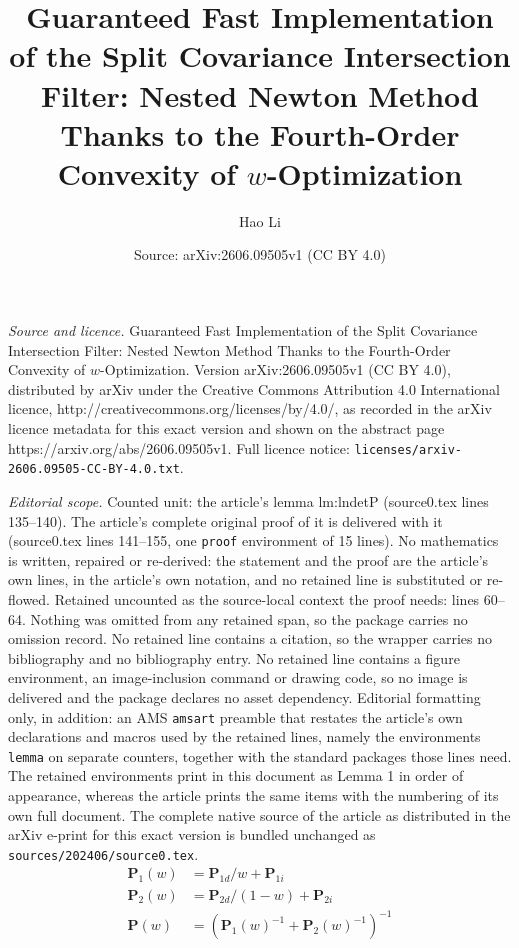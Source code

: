 \documentclass[10pt,a4paper]{amsart}
\title{Guaranteed Fast Implementation of the Split Covariance Intersection Filter: Nested Newton Method Thanks to the Fourth-Order Convexity of $w$-Optimization}
\author{Hao Li}
\date{Source: arXiv:2606.09505v1 (CC BY 4.0)}
\begin{document}
\maketitle

\noindent\emph{Source and licence.} Guaranteed Fast Implementation of the Split Covariance Intersection Filter: Nested Newton Method Thanks to the Fourth-Order Convexity of $w$-Optimization. Version arXiv:2606.09505v1 (CC BY 4.0), distributed by arXiv under the Creative Commons Attribution 4.0 International licence, http://creativecommons.org/licenses/by/4.0/, as recorded in the arXiv licence metadata for this exact version and shown on the abstract page https://arxiv.org/abs/2606.09505v1. Full licence notice: \texttt{licenses/arxiv-2606.09505-CC-BY-4.0.txt}.\par\smallskip

\noindent\textit{Editorial scope.} Counted unit: the article's lemma lm:lndetP (source0.tex lines 135--140). The article's complete original proof of it is delivered with it (source0.tex lines 141--155, one \texttt{proof} environment of 15 lines). No mathematics is written, repaired or re-derived: the statement and the proof are the article's own lines, in the article's own notation, and no retained line is substituted or re-flowed.  Retained uncounted as the source-local context the proof needs: lines 60--64.  Nothing was omitted from any retained span, so the package carries no omission record.  No retained line contains a citation, so the wrapper carries no bibliography and no bibliography entry.  No retained line contains a figure environment, an image-inclusion command or drawing code, so no image is delivered and the package declares no asset dependency.  Editorial formatting only, in addition: an AMS \texttt{amsart} preamble that restates the article's own declarations and macros used by the retained lines, namely the environments \texttt{lemma} on separate counters, together with the standard packages those lines need.  The retained environments print in this document as Lemma 1 in order of appearance, whereas the article prints the same items with the numbering of its own full document.  The complete native source of the article as distributed in the arXiv e-print for this exact version is bundled unchanged as \texttt{sources/202406/source0.tex}.
\begin{align} \label{eq:defineP}
\mathbf{P}_{1}(w) &= \mathbf{P}_{1d}/w + \mathbf{P}_{1i} \nonumber \\
\mathbf{P}_{2}(w) &= \mathbf{P}_{2d}/(1-w) + \mathbf{P}_{2i} \nonumber \\
\mathbf{P}(w) &= (\mathbf{P}_{1}(w)^{-1} + \mathbf{P}_{2}(w)^{-1})^{-1}
\end{align}
\end{document}
